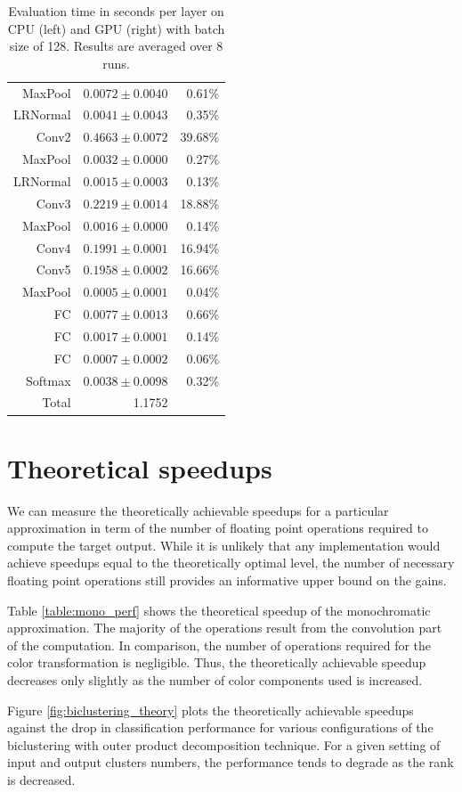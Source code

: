 \documentclass{article} %
\begin{document}
\begin{table}[h]
{\begin{tabular}{rrr}
MaxPool & $0.0072 \pm 0.0040$ & 0.61\% \\
LRNormal & $0.0041 \pm 0.0043$ &  0.35\% \\
Conv2 & $0.4663 \pm 0.0072$ & 39.68\% \\
MaxPool & $0.0032 \pm 0.0000$ &  0.27\% \\
LRNormal & $0.0015 \pm 0.0003$ & 0.13\% \\
Conv3 & $0.2219 \pm 0.0014$ & 18.88\% \\
MaxPool & $0.0016 \pm 0.0000$ & 0.14\% \\
Conv4 & $0.1991 \pm 0.0001$ & 16.94\% \\
Conv5 & $0.1958 \pm 0.0002$ &  16.66\% \\
MaxPool & $0.0005  \pm 0.0001$ & 0.04\% \\
FC & $0.0077 \pm 0.0013$ & 0.66\% \\
FC & $0.0017 \pm 0.0001$ & 0.14\% \\
FC & $0.0007 \pm 0.0002$  & 0.06\% \\
Softmax & $0.0038 \pm 0.0098$ & 0.32\%\\
\hline 
Total & 1.1752 & \\
\hline
\end{tabular}
}
\caption{Evaluation time in seconds per layer on CPU (left)
  and GPU (right) with batch size of 128. Results are averaged over 8
  runs.} 
\label{evaluation_time}
\end{table}


\section{Theoretical speedups}
We can measure the theoretically achievable speedups for a particular approximation in term of the number of floating point operations required to compute the target output.
While it is unlikely that any implementation would achieve speedups equal to the theoretically optimal level, the number of necessary floating point operations still provides an informative upper bound on the gains.

Table \ref{table:mono_perf} shows the theoretical speedup of the monochromatic approximation. 
The majority of the operations result from the convolution part of the computation. 
In comparison, the number of operations required for the color transformation is negligible. 
Thus, the theoretically achievable speedup decreases only slightly as the number of color components used is increased. 

Figure \ref{fig:biclustering_theory} plots the theoretically achievable speedups against the drop in classification performance for various configurations of the biclustering with outer product decomposition technique.  
For a given setting of input and output clusters numbers, the performance tends to degrade as the rank is decreased. 
\end{document}
